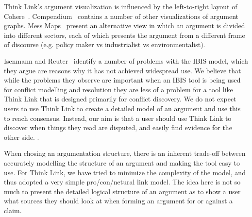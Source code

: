\documentclass{chi2009}
\newcommand{\todo}[1]{}
\begin{document}
Think Link's argument visualization is influenced by the left-to-right layout of Cohere~\cite{Shum2008}. Compendium~\cite{Selvin2001} contains a number of other visualizations of argument graphs. Mess Maps~\cite{Horn2007} present an alternative view in which an argument is divided into different sectors, each of which presents the argument from a different frame of discourse (e.g. policy maker vs industrialist vs environmentalist).

Isenmann and Reuter~\cite{Isenmann1997} identify a number of problems with the IBIS model, which they argue are reasons why it has not achieved widespread use. We believe that while the problems they observe are important when an IBIS tool is being used for conflict modelling and resolution they are less of a problem for a tool like Think Link that is designed primarily for conflict discovery. We do not expect users to use Think Link to create a detailed model of an argument and use this to reach consensus. Instead, our aim is that a user should use Think Link to discover when things they read are disputed, and easily find evidence for the other side.
\todo{Say more about this}.

When chosing an argumentation structure, there is an inherent trade-off between accurately modelling the structure of an argument and making the tool easy to use. For Think Link, we have tried to minimize the complexity of the model, and thus adopted a very simple pro/con/netural link model. The idea here is not so much to present the detailed logical structure of an argument as to show a user what sources they should look at when forming an argument for or against a claim.

% 
% 

% 
% 
% 
% 
% 
% 
\end{document}
